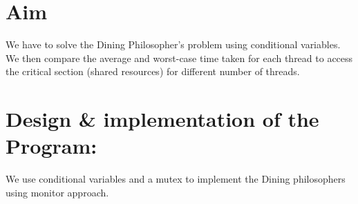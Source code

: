 \documentclass[12pt]{article}
\begin{document}
\maketitle

\section{Aim}
We have to solve the Dining Philosopher’s problem using conditional variables.\\
We then compare the average and worst-case time taken for each thread to access the critical section (shared resources) for different number of threads.

\section{Design \& implementation of the Program:}
We use conditional variables and a mutex to implement the Dining philosophers using monitor approach.
\end{document}
